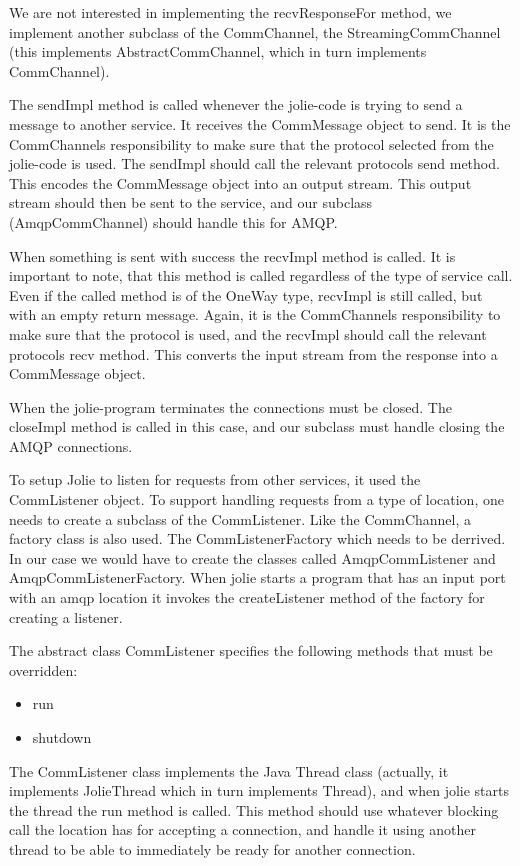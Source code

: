 We are not interested in implementing the recvResponseFor method, we implement another subclass of the CommChannel, the StreamingCommChannel (this implements AbstractCommChannel, which in turn implements CommChannel).

The sendImpl method is called whenever the jolie-code is trying to send a message to another service. It receives the CommMessage object to send. It is the CommChannels responsibility to make sure that the protocol selected from the jolie-code is used. The sendImpl should call the relevant protocols send method. This encodes the CommMessage object into an output stream. This output stream should then be sent to the service, and our subclass (AmqpCommChannel) should handle this for AMQP.

When something is sent with success the recvImpl method is called. It is important to note, that this method is called regardless of the type of service call. Even if the called method is of the OneWay type, recvImpl is still called, but with an empty return message. Again, it is the CommChannels responsibility to make sure that the protocol is used, and the recvImpl should call the relevant protocols recv method. This converts the input stream from the response into a CommMessage object.

When the jolie-program terminates the connections must be closed. The closeImpl method is called in this case, and our subclass must handle closing the AMQP connections.

To setup Jolie to listen for requests from other services, it used the CommListener object. To support handling requests from a type of location, one needs to create a subclass of the CommListener. Like the CommChannel, a factory class is also used. The CommListenerFactory which needs to be derrived. In our case we would have to create the classes called AmqpCommListener and AmqpCommListenerFactory. When jolie starts a program that has an input port with an amqp location it invokes the createListener method of the factory for creating a listener.

The abstract class CommListener specifies the following methods that must be overridden:
\begin{itemize}
  \item{run}
  \item{shutdown}
\end{itemize}

The CommListener class implements the Java Thread class (actually, it implements JolieThread which in turn implements Thread), and when jolie starts the thread the run method is called. This method should use whatever blocking call the location has for accepting a connection, and handle it using another thread to be able to immediately be ready for another connection.


